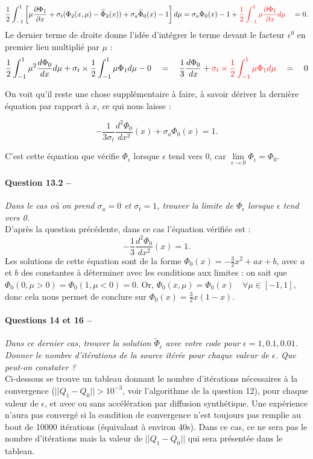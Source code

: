 \documentclass[11pt,a4paper]{article}
\newcommand{\dx}[1]{\dfrac{\partial #1}{\partial x}}
\newcommand{\norm}[1]{\big|\big|#1\big|\big|}
\newcommand{\question}[2]{\paragraph{Question #1 --}\hspace{-7pt}\textit{#2} \\}
\newcommand{\questions}[2]{\paragraph{Questions #1 --}\hspace{-7pt}\textit{#2} \\}
\newcommand{\Phit}{\widetilde{\Phi}}
\begin{document}
\begin{equation}
 \frac{1}{2}\int_{-1}^1 \left[ \mu \dx{\Phi_1} + \sigma_t (\Phi_2(x,\mu) - \Phit_2(x)) + \sigma_a \Phit_0(x) -1 \right] d\mu
 = \sigma_a \Phi_0(x) -1 + \textcolor{red}{\frac{1}{2}\int_{-1}^1  \mu \dx{\Phi_1} d\mu} \quad = 0.
\end{equation}
Le dernier terme de droite donne l'idée d'intégrer le terme devant le facteur $\epsilon^0$ en premier lieu multiplié par $\mu$ :
\begin{equation}
 \frac{1}{2} \int_{-1}^1 \mu^2 \frac{d\Phi_0}{dx} d\mu + \sigma_t \times \frac{1}{2}\int_{-1}^1  \mu \Phi_1 d\mu - 0
 \quad = \quad \frac{1}{3} \frac{d\Phi_0}{dx} + \textcolor{red}{\sigma_t \times \frac{1}{2}\int_{-1}^1  \mu \Phi_1 d\mu}
 \quad = \quad 0
\end{equation}

On voit qu'il reste une chose supplémentaire à faire, à savoir dériver la dernière équation par rapport à $x$, ce qui nous laisse :

\begin{equation}
- \frac{1}{3 \sigma_t} \frac{d^2 \Phi_0}{d x^2}(x) + \sigma_a\Phi_0(x) = 1 .
\end{equation}

C'est cette équation que vérifie $\Phi_\epsilon$ lorsque $\epsilon$ tend vers 0, car $\lim\limits_{\epsilon \rightarrow 0} \Phi_\epsilon = \Phi_0$.

\question{13.2}{Dans le cas où on prend $\sigma_a = 0$ et $\sigma_t = 1$, trouver la limite de $\Phi_\epsilon$ lorsque $\epsilon$ tend vers 0.}

D'après la question précédente, dans ce cas l'équation vérifiée est :
\begin{equation}
- \frac{1}{3} \frac{d^2 \Phi_0}{d x^2}(x) = 1 .
\end{equation}
Les solutions de cette équation sont de la forme $\Phi_0(x) = -\frac{3}{2}x^2 + a x +b$, avec $a$ et $b$ des constantes à déterminer avec les conditions aux limites : on sait que $\Phi_0(0,\mu >0) = \Phi_0(1,\mu <0) = 0$.
Or, $\Phi_0(x,\mu) = \Phi_0(x) \quad \forall \mu \in [-1,1]$, donc cela nous permet de conclure sur $\Phi_0(x) = \frac{3}{2}x(1-x)$.

\questions{14 et 16}{Dans ce dernier cas, trouver la solution $\Phit_\epsilon$ avec votre code pour $\epsilon = 1, 0.1, 0.01$. Donner le nombre d'itérations de la source itérée pour chaque valeur de $\epsilon$. Que peut-on constater ?}

Ci-dessous se trouve un tableau donnant le nombre d'itérations nécessaires à la convergence ($\norm{Q_1 - Q_0}>10^{-3}$, voir l'algorithme de la question 12), pour chaque valeur de $\epsilon$, et avec ou sans accélération par diffusion synthétique.
Une expérience n'aura pas convergé si la condition de convergence n'est toujours pas remplie au bout de 10000 itérations (équivalant à environ 40s).
Dans ce cas, ce ne sera pas le nombre d'itérations mais la valeur de $\norm{Q_1 - Q_0}$ qui sera présentée dans le tableau.
\end{document}
